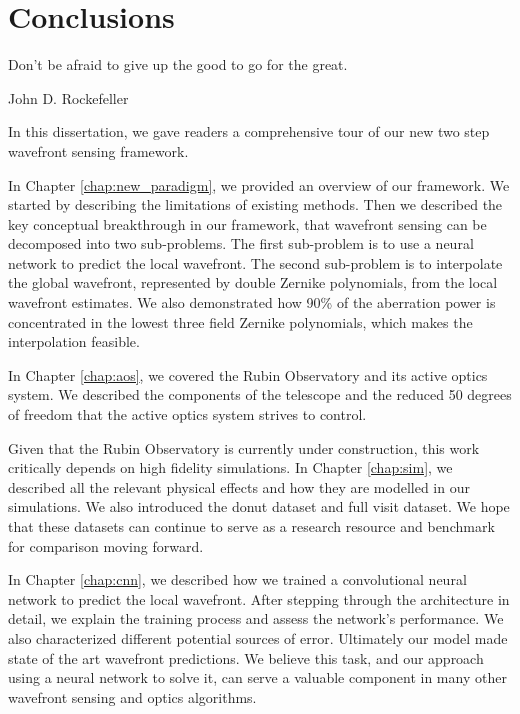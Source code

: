 \chapter{Conclusions}
\label{chap:conclusion}
\epigraph{Don't be afraid to give up the good to go for the great.}{John D. Rockefeller}

In this dissertation, we gave readers a comprehensive tour of our new two step wavefront sensing framework. 

In Chapter \ref{chap:new_paradigm}, we provided an overview of our framework. We started by describing the limitations of existing methods. Then we described the key conceptual breakthrough in our framework, that wavefront sensing can be decomposed into two sub-problems. The first sub-problem is to use a neural network to predict the local wavefront. The second sub-problem is to interpolate the global wavefront, represented by double Zernike polynomials, from the local wavefront estimates. We also demonstrated how 90\% of the aberration power is concentrated in the lowest three field Zernike polynomials, which makes the interpolation feasible. 

In Chapter \ref{chap:aos}, we covered the Rubin Observatory and its active optics system. We described the components of the telescope and the reduced 50 degrees of freedom that the active optics system strives to control.

Given that the Rubin Observatory is currently under construction, this work critically depends on high fidelity simulations. In Chapter \ref{chap:sim}, we described all the relevant physical effects and how they are modelled in our simulations. We also introduced the donut dataset and full visit dataset. We hope that these datasets can continue to serve as a research resource and benchmark for comparison moving forward. 

In Chapter \ref{chap:cnn}, we described how we trained a convolutional neural network to predict the local wavefront. After stepping through the architecture in detail, we explain the training process and assess the network's performance. We also characterized different potential sources of error. Ultimately our model made state of the art wavefront predictions. We believe this task, and our approach using a neural network to solve it, can serve a valuable component in many other wavefront sensing and optics algorithms.

